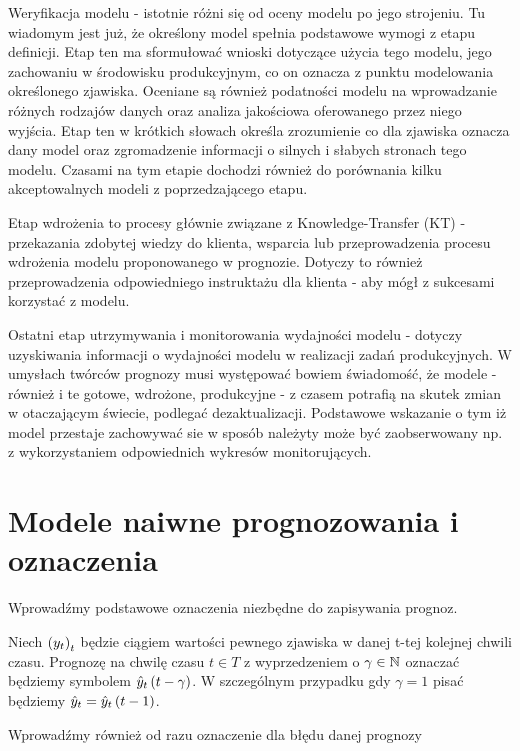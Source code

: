\documentclass[10pt,a4paper]{book}
\begin{document}
Weryfikacja modelu - istotnie różni się od oceny modelu po jego strojeniu. Tu wiadomym jest już, że określony model spełnia podstawowe wymogi z etapu definicji. Etap ten ma sformułować wnioski dotyczące użycia tego modelu, jego zachowaniu w środowisku produkcyjnym, co on oznacza z punktu modelowania określonego zjawiska. Oceniane są również podatności modelu na wprowadzanie różnych rodzajów danych oraz analiza jakościowa oferowanego przez niego wyjścia. Etap ten w krótkich słowach określa zrozumienie co dla zjawiska oznacza dany model oraz zgromadzenie informacji o silnych i słabych stronach tego modelu. Czasami na tym etapie dochodzi również do porównania kilku akceptowalnych modeli z poprzedzającego etapu.

Etap wdrożenia to procesy głównie związane z Knowledge-Transfer (KT)  - przekazania zdobytej wiedzy do klienta, wsparcia lub przeprowadzenia procesu wdrożenia modelu proponowanego w prognozie. Dotyczy to również przeprowadzenia odpowiedniego instruktażu dla klienta - aby mógł z sukcesami korzystać z modelu.

Ostatni etap utrzymywania i monitorowania wydajności modelu - dotyczy uzyskiwania informacji o wydajności modelu w realizacji zadań produkcyjnych. W umysłach twórców prognozy musi występować bowiem świadomość, że modele  -również i te gotowe, wdrożone, produkcyjne - z czasem potrafią na skutek zmian w otaczającym świecie, podlegać dezaktualizacji. Podstawowe wskazanie o tym iż model przestaje zachowywać sie w sposób należyty może być zaobserwowany np. z wykorzystaniem odpowiednich wykresów monitorujących.

\section{Modele naiwne prognozowania i oznaczenia}

Wprowadźmy podstawowe oznaczenia niezbędne do zapisywania prognoz.

\begin{definition}
Niech $\left( {y_t} \right)_{t}^{} $ będzie ciągiem wartości pewnego zjawiska w danej t-tej kolejnej chwili czasu. Prognozę na chwilę czasu $t \in T$ z wyprzedzeniem o $\gamma \in \mathbb{N}$ oznaczać będziemy symbolem $\predict[t-\gamma]{y}{t}$. W szczególnym przypadku gdy $\gamma =1$ pisać będziemy $\predict{y}{t}= \predict[t-1]{y}{t}$.
\end{definition}

Wprowadźmy również od razu oznaczenie dla błędu danej prognozy
\end{document}
